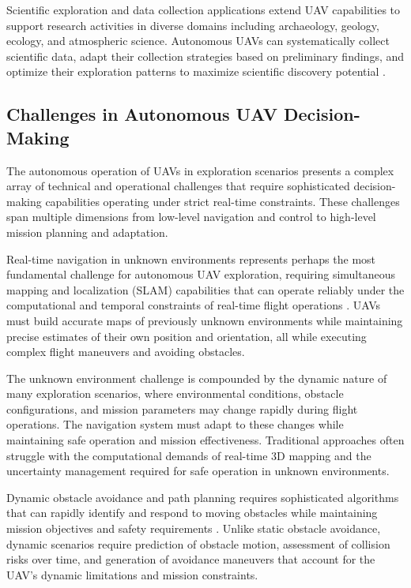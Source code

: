 Scientific exploration and data collection applications extend UAV capabilities to support research activities in diverse domains including archaeology, geology, ecology, and atmospheric science. Autonomous UAVs can systematically collect scientific data, adapt their collection strategies based on preliminary findings, and optimize their exploration patterns to maximize scientific discovery potential \cite{ware2016arctic}.

\subsection{Challenges in Autonomous UAV Decision-Making}

The autonomous operation of UAVs in exploration scenarios presents a complex array of technical and operational challenges that require sophisticated decision-making capabilities operating under strict real-time constraints. These challenges span multiple dimensions from low-level navigation and control to high-level mission planning and adaptation.

Real-time navigation in unknown environments represents perhaps the most fundamental challenge for autonomous UAV exploration, requiring simultaneous mapping and localization (SLAM) capabilities that can operate reliably under the computational and temporal constraints of real-time flight operations \cite{cadena2016past}. UAVs must build accurate maps of previously unknown environments while maintaining precise estimates of their own position and orientation, all while executing complex flight maneuvers and avoiding obstacles.

The unknown environment challenge is compounded by the dynamic nature of many exploration scenarios, where environmental conditions, obstacle configurations, and mission parameters may change rapidly during flight operations. The navigation system must adapt to these changes while maintaining safe operation and mission effectiveness. Traditional approaches often struggle with the computational demands of real-time 3D mapping and the uncertainty management required for safe operation in unknown environments.

Dynamic obstacle avoidance and path planning requires sophisticated algorithms that can rapidly identify and respond to moving obstacles while maintaining mission objectives and safety requirements \cite{goerzen2010survey}. Unlike static obstacle avoidance, dynamic scenarios require prediction of obstacle motion, assessment of collision risks over time, and generation of avoidance maneuvers that account for the UAV's dynamic limitations and mission constraints.

